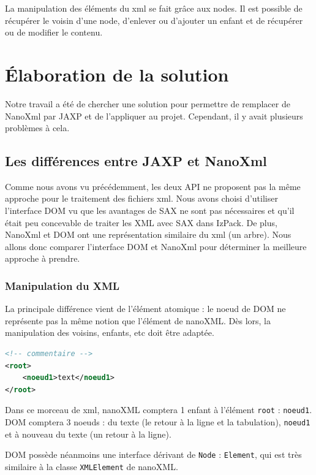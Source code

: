 La manipulation des éléments du xml se fait grâce aux nodes.
Il est possible de récupérer le voisin d'une node, d'enlever ou d'ajouter un enfant et de récupérer ou de modifier le contenu.
\section{Élaboration de la solution}
Notre travail a été de chercher une solution pour permettre de remplacer de NanoXml par JAXP et de l'appliquer au projet.
Cependant, il y avait plusieurs problèmes à cela.
\subsection{Les différences entre JAXP et NanoXml}
Comme nous avons vu précédemment, les deux API ne proposent pas la même approche pour le traitement des fichiers xml.
Nous avons choisi d'utiliser l'interface DOM vu que les avantages de SAX ne sont pas nécessaires et qu'il était peu concevable de traiter les XML avec SAX dans IzPack.
De plus, NanoXml et DOM ont une représentation similaire du xml (un arbre).
Nous allons donc comparer l'interface DOM et NanoXml pour déterminer la meilleure approche à prendre.
\subsubsection{Manipulation du XML}
La principale différence vient de l'élément atomique : le noeud de DOM ne représente pas la même notion que l'élément de nanoXML.
Dès lors, la manipulation des voisins, enfants, etc doit être adaptée.
\begin{lstlisting}[language=xml]
<!-- commentaire -->
<root>
	<noeud1>text</noeud1>
</root>
\end{lstlisting}
Dans ce morceau de xml, nanoXML comptera 1 enfant à l'élément \verb|root| : \verb|noeud1|.
DOM comptera 3 noeuds : du texte (le retour à la ligne et la tabulation), \verb|noeud1| et à nouveau du texte (un retour à la ligne).

DOM possède néanmoins une interface dérivant de \verb|Node| : \verb|Element|, qui est très similaire à la classe \verb|XMLElement| de nanoXML.
